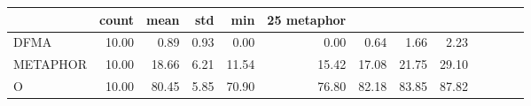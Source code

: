 \begin{tabular}{lrrrrrrrr}
\toprule
 & count & mean & std & min & 25%
metaphor &  &  &  &  &  &  &  &  \\
\midrule
DFMA & 10.00 & 0.89 & 0.93 & 0.00 & 0.00 & 0.64 & 1.66 & 2.23 \\
METAPHOR & 10.00 & 18.66 & 6.21 & 11.54 & 15.42 & 17.08 & 21.75 & 29.10 \\
O & 10.00 & 80.45 & 5.85 & 70.90 & 76.80 & 82.18 & 83.85 & 87.82 \\
\bottomrule
\end{tabular}
